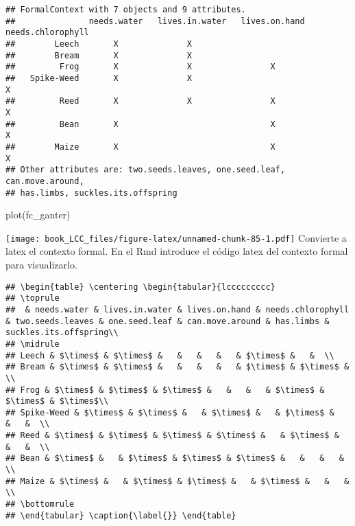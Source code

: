 \documentclass[
]{book}
\newenvironment{Shaded}{\begin{snugshade}}{\end{snugshade}}
\newcommand{\FunctionTok}[1]{\textcolor[rgb]{0.00,0.00,0.00}{#1}}
\newcommand{\NormalTok}[1]{#1}
\newcommand{\SpecialCharTok}[1]{\textcolor[rgb]{0.00,0.00,0.00}{#1}}
\begin{document}
\begin{verbatim}
## FormalContext with 7 objects and 9 attributes.
##               needs.water   lives.in.water   lives.on.hand   needs.chlorophyll  
##        Leech       X              X                                             
##        Bream       X              X                                             
##         Frog       X              X                X                            
##   Spike-Weed       X              X                                  X          
##         Reed       X              X                X                 X          
##         Bean       X                               X                 X          
##        Maize       X                               X                 X          
## Other attributes are: two.seeds.leaves, one.seed.leaf, can.move.around,
## has.limbs, suckles.its.offspring
\end{verbatim}

\begin{Shaded}
\begin{Highlighting}[]
\FunctionTok{plot}\NormalTok{(fc\_ganter)}
\end{Highlighting}
\end{Shaded}

\texttt{[image: book\_LCC\_files/figure-latex/unnamed-chunk-85-1.pdf]}
Convierte a latex el contexto formal. En el Rmd introduce el código latex del contexto formal para visualizarlo.

\begin{Shaded}
\end{Shaded}

\begin{verbatim}
## \begin{table} \centering \begin{tabular}{lccccccccc}
## \toprule
##  & needs.water & lives.in.water & lives.on.hand & needs.chlorophyll & two.seeds.leaves & one.seed.leaf & can.move.around & has.limbs & suckles.its.offspring\\
## \midrule
## Leech & $\times$ & $\times$ &   &   &   &   & $\times$ &   &  \\ 
## Bream & $\times$ & $\times$ &   &   &   &   & $\times$ & $\times$ &  \\ 
## Frog & $\times$ & $\times$ & $\times$ &   &   &   & $\times$ & $\times$ & $\times$\\ 
## Spike-Weed & $\times$ & $\times$ &   & $\times$ &   & $\times$ &   &   &  \\ 
## Reed & $\times$ & $\times$ & $\times$ & $\times$ &   & $\times$ &   &   &  \\ 
## Bean & $\times$ &   & $\times$ & $\times$ & $\times$ &   &   &   &  \\ 
## Maize & $\times$ &   & $\times$ & $\times$ &   & $\times$ &   &   &  \\
## \bottomrule
## \end{tabular} \caption{\label{}} \end{table}
\end{verbatim}
\end{document}
